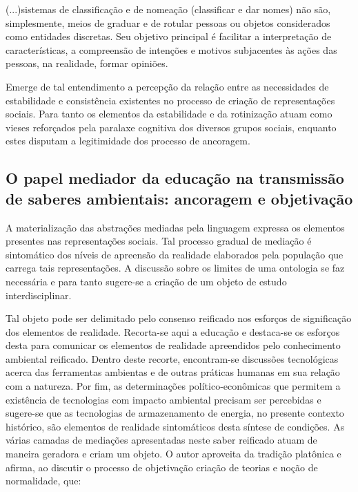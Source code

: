 \documentclass[
   article,       %
   12pt,          %
   oneside,       %
   a4paper,       %
   english,       %
   brazil,           %
   sumario=tradicional
   ]{abntex2}
\begin{document}
\begin{citacao}
(...)sistemas de classificação e de nomeação
(classificar e dar nomes) não são, simplesmente, meios de graduar
e de rotular pessoas ou objetos considerados como entidades 
discretas. Seu objetivo principal é facilitar a interpretação de 
características, a compreensão de intenções e motivos subjacentes às
ações das pessoas, na realidade, formar opiniões.\cite[p.70]{Representacees_sociais_moscovici}
\end{citacao}


Emerge de tal entendimento a percepção da relação entre as necessidades de estabilidade e consistência existentes no processo de criação de representações sociais. Para tanto os elementos da estabilidade e da rotinização atuam como vieses reforçados pela paralaxe cognitiva dos diversos grupos sociais, enquanto estes disputam a legitimidade dos processo de ancoragem.


\subsection{O papel mediador da educação na transmissão de saberes ambientais: ancoragem e objetivação}

A materialização das abstrações mediadas pela linguagem expressa os elementos presentes nas representações sociais. Tal processo gradual de mediação é sintomático dos níveis de apreensão da realidade elaborados pela população que carrega tais representações. A discussão sobre os limites de uma ontologia se faz necessária e para tanto sugere-se a criação de um objeto de estudo interdisciplinar.

Tal objeto pode ser delimitado pelo consenso reificado nos esforços de significação dos elementos de realidade. Recorta-se aqui a educação e destaca-se os esforços desta para comunicar os elementos de realidade apreendidos pelo conhecimento ambiental reificado. Dentro deste recorte, encontram-se discussões tecnológicas acerca das ferramentas ambientas e de outras práticas humanas em sua relação com a natureza. Por fim, as determinações político-econômicas que permitem a existência de tecnologias com impacto ambiental precisam ser percebidas e sugere-se que as tecnologias de armazenamento de energia, no presente contexto histórico, são elementos de realidade sintomáticos desta síntese de condições. As várias camadas de mediações apresentadas neste saber reificado atuam de maneira geradora e criam um objeto. O autor aproveita da tradição platônica e afirma, ao discutir o processo de objetivação criação de teorias e noção de normalidade, que:
\end{document}
